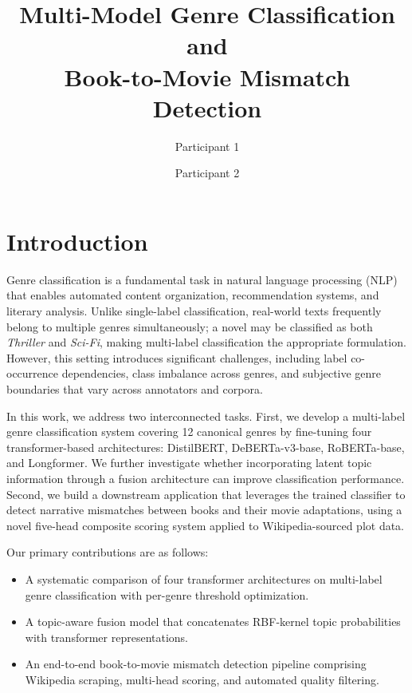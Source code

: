 \documentclass[11pt,a4paper]{article}
\title{\Large\textbf{Multi-Model Genre Classification and\\Book-to-Movie Mismatch Detection}}
\author{Participant 1 \and Participant 2}
\date{}
\begin{document}
\maketitle

\section{Introduction}

Genre classification is a fundamental task in natural language processing (NLP) that enables automated content organization, recommendation systems, and literary analysis. Unlike single-label classification, real-world texts frequently belong to multiple genres simultaneously; a novel may be classified as both \textit{Thriller} and \textit{Sci-Fi}, making multi-label classification the appropriate formulation. However, this setting introduces significant challenges, including label co-occurrence dependencies, class imbalance across genres, and subjective genre boundaries that vary across annotators and corpora.

In this work, we address two interconnected tasks. First, we develop a multi-label genre classification system covering 12 canonical genres by fine-tuning four transformer-based architectures: DistilBERT, DeBERTa-v3-base, RoBERTa-base, and Longformer. We further investigate whether incorporating latent topic information through a fusion architecture can improve classification performance. Second, we build a downstream application that leverages the trained classifier to detect narrative mismatches between books and their movie adaptations, using a novel five-head composite scoring system applied to Wikipedia-sourced plot data.

Our primary contributions are as follows:
\begin{itemize}[nosep]
    \item A systematic comparison of four transformer architectures on multi-label genre classification with per-genre threshold optimization.
    \item A topic-aware fusion model that concatenates RBF-kernel topic probabilities with transformer representations.
    \item An end-to-end book-to-movie mismatch detection pipeline comprising Wikipedia scraping, multi-head scoring, and automated quality filtering.
\end{itemize}
\end{document}
